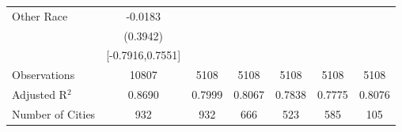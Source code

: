 \documentclass{article}
\begin{document}
\begin{table}[htbp]
\begin{tabular}{l*{6}{c}}
Other Race          &     -0.0183   &               &               &               &               &               \\
                    &    (0.3942)   &               &               &               &               &               \\
                    &[-0.7916,0.7551]   &               &               &               &               &               \\
\midrule
Observations        &       10807   &        5108   &        5108   &        5108   &        5108   &        5108   \\
Adjusted R$^2$      &      0.8690   &      0.7999   &      0.8067   &      0.7838   &      0.7775   &      0.8076   \\
Number of Cities    &         932   &         932   &         666   &         523   &         585   &         105   \\
\bottomrule
\end{tabular}
\end{table}
\end{document}
